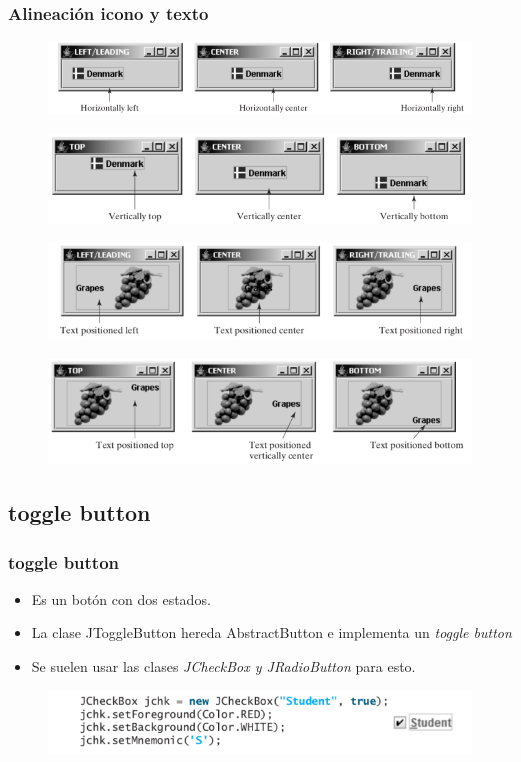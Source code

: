 \documentclass{beamer}
\begin{document}
\begin{frame}
\frametitle{Alineación icono y texto} 
\begin{figure}
\includegraphics[scale=0.4]{imagenes/ih.png} 
\end{figure} 
\begin{figure}
\includegraphics[scale=0.4]{imagenes/iv.png} 
\end{figure} 
\begin{figure}
\includegraphics[scale=0.4]{imagenes/th.png} 
\end{figure} 
\begin{figure}
\includegraphics[scale=0.4]{imagenes/tv.png} 
\end{figure} 
\end{frame}

\subsection{toggle button}
\begin{frame}
\frametitle{toggle button}
\begin{itemize}[<+->]
\item Es un botón con dos estados.
\item La clase \alert{JToggleButton} hereda AbstractButton e implementa un \emph{toggle button}
\item Se suelen usar las clases \emph{JCheckBox y JRadioButton} para esto.
\end{itemize}
\begin{figure}
\includegraphics[scale=0.7]{imagenes/toogle1.png}
\end{figure}
\end{frame}
\end{document}
